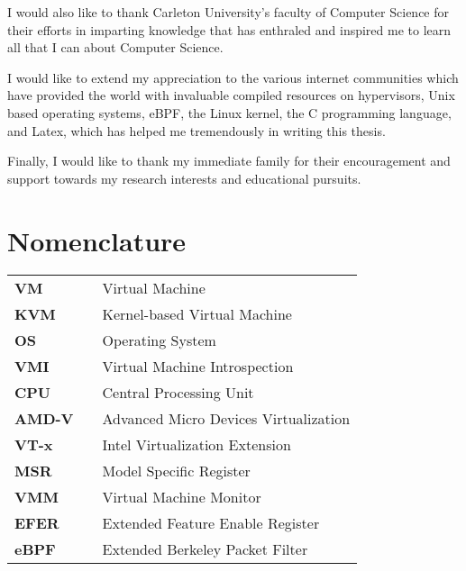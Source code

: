 \documentclass{report}
\begin{document}
\begin{spacing}{1.5}
{\large I would also like to thank Carleton University's faculty of Computer Science for their efforts in imparting knowledge that has enthraled and inspired me to learn all that I can about Computer Science.}

{\large I would like to extend my appreciation to the various internet communities which have provided the world with invaluable compiled resources on hypervisors, Unix based operating systems, eBPF, the Linux kernel, the C programming language, and Latex, which has helped me tremendously in writing this thesis.}

{\large Finally, I would like to thank my immediate family for their encouragement and support towards my research interests and educational pursuits.}

\tableofcontents












\newpage
\chapter*{Nomenclature}

\begin{tabular}{lcl}
\large{\bf VM}  & & \large{Virtual Machine} \\
\large{\bf KVM}  & & \large{Kernel-based Virtual Machine} \\
\large{\bf OS}   & & \large{Operating System}        \\
\large{\bf VMI}  & & \large{Virtual Machine Introspection} \\
\large{\bf CPU}  & & \large{Central Processing Unit} \\
\large{\bf AMD-V}  & & \large{Advanced Micro Devices Virtualization} \\
\large{\bf VT-x}  & & \large{Intel Virtualization Extension} \\
\large{\bf MSR}  & & \large{Model Specific Register} \\
\large{\bf VMM}  & & \large{Virtual Machine Monitor} \\
\large{\bf EFER}  & & \large{Extended Feature Enable Register} \\
\large{\bf eBPF}  & & \large{Extended Berkeley Packet Filter} \\
\end{tabular}















\end{spacing}
\end{document}
